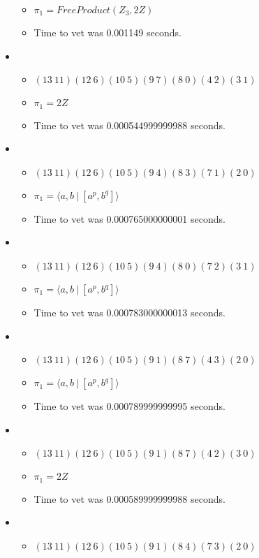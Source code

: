 \documentclass{article}
\begin{document}
\begin{itemize}
\begin{itemize}
      \item $\pi_1 =FreeProduct( Z_3, 2 Z )$
      \item Time to vet was 0.001149 seconds.
\end{itemize}
\item \begin{itemize}
      \item $(13\ 11)(12\ 6)(10\ 5)(9\ 7)(8\ 0)(4\ 2)(3\ 1)$
      \item $\pi_1 =2 Z$
      \item Time to vet was 0.000544999999988 seconds.
\end{itemize}
\item \begin{itemize}
      \item $(13\ 11)(12\ 6)(10\ 5)(9\ 4)(8\ 3)(7\ 1)(2\ 0)$
      \item $\pi_1 = \langle a,b\ |\ [a^p,b^q]\rangle$
      \item Time to vet was 0.000765000000001 seconds.
\end{itemize}
\item \begin{itemize}
      \item $(13\ 11)(12\ 6)(10\ 5)(9\ 4)(8\ 0)(7\ 2)(3\ 1)$
      \item $\pi_1 = \langle a,b\ |\ [a^p,b^q]\rangle$
      \item Time to vet was 0.000783000000013 seconds.
\end{itemize}
\item \begin{itemize}
      \item $(13\ 11)(12\ 6)(10\ 5)(9\ 1)(8\ 7)(4\ 3)(2\ 0)$
      \item $\pi_1 = \langle a,b\ |\ [a^p,b^q]\rangle$
      \item Time to vet was 0.000789999999995 seconds.
\end{itemize}
\item \begin{itemize}
      \item $(13\ 11)(12\ 6)(10\ 5)(9\ 1)(8\ 7)(4\ 2)(3\ 0)$
      \item $\pi_1 =2 Z$
      \item Time to vet was 0.000589999999988 seconds.
\end{itemize}
\item \begin{itemize}
      \item $(13\ 11)(12\ 6)(10\ 5)(9\ 1)(8\ 4)(7\ 3)(2\ 0)$

\end{itemize}
\end{itemize}
\end{document}

